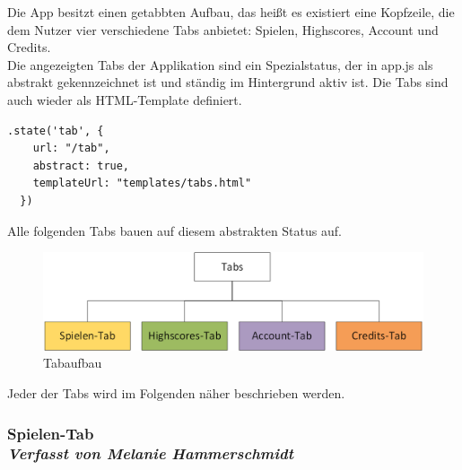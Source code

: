 Die App besitzt einen getabbten Aufbau, das heißt es existiert eine Kopfzeile, die dem Nutzer vier verschiedene Tabs anbietet: Spielen, Highscores, Account und Credits. 
\\
Die angezeigten Tabs der Applikation sind ein Spezialstatus, der in app.js als abstrakt gekennzeichnet ist und ständig im Hintergrund aktiv ist. Die Tabs sind auch wieder als HTML-Template definiert.
\begin{lstlisting}
.state('tab', {
    url: "/tab",
    abstract: true,
    templateUrl: "templates/tabs.html"
  })
\end{lstlisting}
Alle folgenden Tabs bauen auf diesem abstrakten Status auf.
\begin{figure}[h]
\centering
\includegraphics[width=1\textwidth]{ref/images/tabs.png}
\caption[Tabaufbau]{Tabaufbau}
\label{fig:Tabaufbau}
\end{figure}

Jeder der Tabs wird im Folgenden näher beschrieben werden.
\newpage
\subsubsection[Spielen-Tab]{Spielen-Tab
 \\ \textnormal{\small{\textit {Verfasst von Melanie Hammerschmidt}}}}
 
